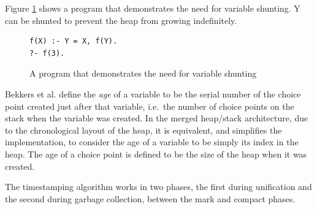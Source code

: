 Figure \ref{fig:shunt-program} shows a program that demonstrates the need for variable shunting. Y can be shunted to prevent the heap from growing indefinitely.

\begin{figure}[H]
\centering
\begin{verbatim}
f(X) :- Y = X, f(Y).
?- f(3).
\end{verbatim}
\caption{A program that demonstrates the need for variable shunting}
\label{fig:shunt-program}
\end{figure}

Bekkers et al. define the \emph{age} of a variable to be the serial number of the choice point created just after that variable, i.e.\ the number of choice points on the stack when the variable was created. In the merged heap/stack architecture, due to the chronological layout of the heap, it is equivalent, and simplifies the implementation, to consider the age of a variable to be simply its index in the heap. The age of a choice point is defined to be the size of the heap when it was created.

The timestamping algorithm works in two phases, the first during unification and the second during garbage collection, between the mark and compact phases.

